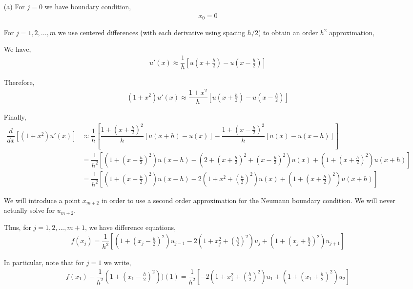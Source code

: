 \documentclass[10pt]{article}
\begin{document}
\begin{solution}
\begin{enumerate}
    \item[(a)]
       For \( j=0 \) we have boundary condition,
        \begin{align*}
            x_0 = 0
        \end{align*}

        For \( j=1,2,...,m \) we use centered differences (with each derivative using spacing \( h/2 \)) to obtain an order \( h^2 \) approximation,

        We have,
        \begin{align*}
            u'(x) \approx \dfrac{1}{h}[u(x+\tfrac{h}{2})-u(x-\tfrac{h}{2})]
        \end{align*}
        
        Therefore,
        \begin{align*}
            (1+x^2)u'(x) \approx \dfrac{1+x^2}{h}[u(x+\tfrac{h}{2})-u(x-\tfrac{h}{2})]
        \end{align*}

        Finally,
        \begin{align*}
            \dfrac{d}{dx}[(1+x^2)u'(x)] &\approx
            \dfrac{1}{h} \left[ \dfrac{1+(x+\frac{h}{2})^2}{h}[u(x+h)-u(x)] - \dfrac{1+(x-\frac{h}{2})^2}{h}[u(x)-u(x-h)] \right] \\
            &= \dfrac{1}{h^2} \left[ (1+(x-\tfrac{h}{2})^2)u(x-h) - (2+(x+\tfrac{h}{2})^2+(x-\tfrac{h}{2})^2)u(x) + (1+(x+\tfrac{h}{2})^2)u(x+h) \right] \\
            &= \dfrac{1}{h^2} \left[ (1+(x-\tfrac{h}{2})^2)u(x-h) - 2(1+x^2+(\tfrac{h}{2})^2)u(x) + (1+(x+\tfrac{h}{2})^2)u(x+h) \right]
        \end{align*}

        We will introduce a point \( x_{m+2} \) in order to use a second order approximation for the Neumann boundary condition. We will never actually solve for \( u_{m+2} \).

        Thus, for \( j=1,2,...,m+1 \), we have difference equations,
        \begin{align*}
            f(x_j) = \dfrac{1}{h^2}[(1+(x_j-\tfrac{h}{2})^2)u_{j-1} - 2(1+x_j^2+(\tfrac{h}{2})^2)u_j + (1+(x_j+\tfrac{h}{2})^2)u_{j+1}    ] 
        \end{align*}

        In particular, note that for \( j=1 \) we write,
        \begin{align*}
            f(x_1)-\dfrac{1}{h^2}(1+(x_1-\tfrac{h}{2})^2))(1) = \dfrac{1}{h^2} [ -2(1+x_1^2+(\tfrac{h}{2})^2)u_{1} + (1+(x_1+\tfrac{h}{2})^2)u_{2} ]
        \end{align*}


\end{enumerate}
\end{solution}
\end{document}
